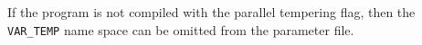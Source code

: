If the program is not compiled with the parallel tempering flag, then the \texttt{VAR\_TEMP} name space can be omitted from the parameter file.



